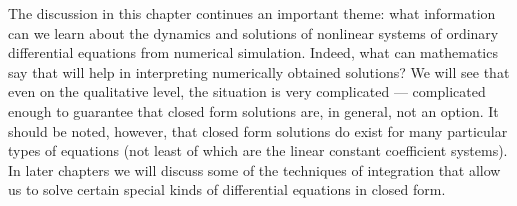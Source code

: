 The discussion in this chapter continues an important theme: what 
information can we learn about the dynamics and solutions of nonlinear 
systems of ordinary differential equations from numerical simulation.  
Indeed, what can mathematics say that will help in interpreting numerically 
obtained solutions?  We will see that even on the qualitative level, the 
situation is very complicated --- complicated enough to guarantee that closed 
form solutions are, in general, not an option.  It should be noted, however,
that closed form solutions do exist for many particular types of equations 
(not least of which are the linear constant coefficient systems).  In later
chapters we will discuss some of the techniques of integration that allow us
to solve certain special kinds of differential equations in closed form.


\label{sec:LinHomSys}

